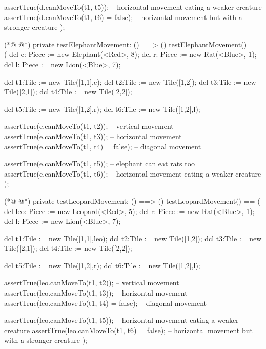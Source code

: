 \begin{vdmpp}[breaklines=true]
             assertTrue(d.canMoveTo(t1, t5)); -- horizontal movement eating a weaker creature
             assertTrue(d.canMoveTo(t1, t6) = false); -- horizontal movement but with a stronger creature
                );
                
(*@
\label{testElephantMovement:54}
@*)
   private testElephantMovement: () ==> ()
         testElephantMovement() ==
         (
                 dcl e: Piece := new Elephant(<Red>, 8);
                 dcl r: Piece := new Rat(<Blue>, 1);
                 dcl l: Piece := new Lion(<Blue>, 7);
                 
             dcl t1:Tile := new Tile([1,1],e);
             dcl t2:Tile := new Tile([1,2]);
             dcl t3:Tile := new Tile([2,1]);
             dcl t4:Tile := new Tile([2,2]);
             
             dcl t5:Tile := new Tile([1,2],r);
             dcl t6:Tile := new Tile([1,2],l);
             
             assertTrue(e.canMoveTo(t1, t2)); -- vertical movement
             assertTrue(e.canMoveTo(t1, t3)); -- horizontal movement
             assertTrue(e.canMoveTo(t1, t4) = false); -- diagonal movement
             
             assertTrue(e.canMoveTo(t1, t5)); -- elephant can eat rats too
             assertTrue(e.canMoveTo(t1, t6)); -- horizontal movement eating a weaker creature
  );
  
(*@
\label{testLeopardMovement:77}
@*)
   private testLeopardMovement: () ==> ()
         testLeopardMovement() ==
         (
                 dcl leo: Piece := new Leopard(<Red>, 5);
                 dcl r: Piece := new Rat(<Blue>, 1);
                 dcl l: Piece := new Lion(<Blue>, 7);
                 
             dcl t1:Tile := new Tile([1,1],leo);
             dcl t2:Tile := new Tile([1,2]);
             dcl t3:Tile := new Tile([2,1]);
             dcl t4:Tile := new Tile([2,2]);
             
             dcl t5:Tile := new Tile([1,2],r);
             dcl t6:Tile := new Tile([1,2],l);
             
             assertTrue(leo.canMoveTo(t1, t2)); -- vertical movement
             assertTrue(leo.canMoveTo(t1, t3)); -- horizontal movement
             assertTrue(leo.canMoveTo(t1, t4) = false); -- diagonal movement
             
             assertTrue(leo.canMoveTo(t1, t5)); -- horizontal movement eating a weaker creature
             assertTrue(leo.canMoveTo(t1, t6) = false); -- horizontal movement but with a stronger creature
  );
  

\end{vdmpp}
